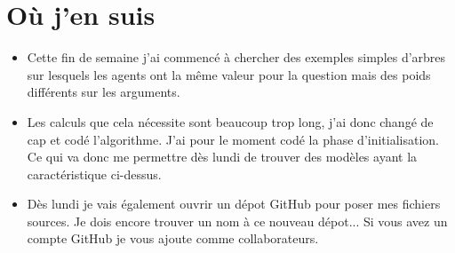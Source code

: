 \documentclass[12pt]{article}
\theoremstyle{defi}
\theoremstyle{not}
\theoremstyle{prob}
\begin{document}
\section{Où j'en suis}
\color{red}
\begin{itemize}
  \item Cette fin de semaine j'ai commencé à chercher des exemples simples d'arbres sur lesquels les agents ont la même valeur pour la question mais des poids différents sur les arguments.

  \item Les calculs que cela nécessite sont beaucoup trop long, j'ai donc changé de cap et codé l'algorithme. J'ai pour le moment codé la phase d'initialisation. Ce qui va donc me permettre dès lundi de trouver des modèles ayant la caractéristique ci-dessus.

  \item Dès lundi je vais également ouvrir un dépot GitHub pour poser mes fichiers sources. Je dois encore trouver un nom à ce nouveau dépot... Si vous avez un compte GitHub je vous ajoute comme collaborateurs.
\end{itemize}
\end{document}
